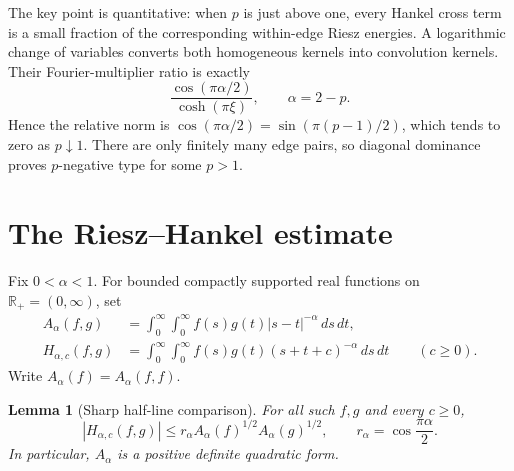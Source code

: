 \documentclass[11pt]{article}
\newtheorem{lemma}[theorem]{Lemma}
\newcommand{\R}{\mathbb R}
\begin{document}
The key point is quantitative: when $p$ is just above one, every Hankel cross
term is a small fraction of the corresponding within-edge Riesz energies.  A
logarithmic change of variables converts both homogeneous kernels into
convolution kernels.  Their Fourier-multiplier ratio is exactly
\[
  \frac{\cos(\pi\alpha/2)}{\cosh(\pi\xi)},\qquad \alpha=2-p.
\]
Hence the relative norm is $\cos(\pi\alpha/2)
=\sin(\pi(p-1)/2)$, which tends to zero as $p\downarrow1$.
There are only finitely many edge pairs, so diagonal dominance proves
$p$-negative type for some $p>1$.

\section{The Riesz--Hankel estimate}

Fix $0<\alpha<1$.  For bounded compactly supported real functions on
$\R_+=(0,\infty)$, set
\begin{align*}
 A_\alpha(f,g)
   &=\int_0^\infty\!\int_0^\infty
       f(s)g(t)|s-t|^{-\alpha}\,ds\,dt,\\
 H_{\alpha,c}(f,g)
   &=\int_0^\infty\!\int_0^\infty
       f(s)g(t)(s+t+c)^{-\alpha}\,ds\,dt
       \qquad(c\ge0).
\end{align*}
Write $A_\alpha(f)=A_\alpha(f,f)$.

\begin{lemma}[Sharp half-line comparison]\label{lem:hankel}
For all such $f,g$ and every $c\ge0$,
\[
 |H_{\alpha,c}(f,g)|
 \le r_\alpha A_\alpha(f)^{1/2}A_\alpha(g)^{1/2},
 \qquad r_\alpha=\cos\frac{\pi\alpha}{2}.
\]
In particular, $A_\alpha$ is a positive definite quadratic form.
\end{lemma}
\end{document}
